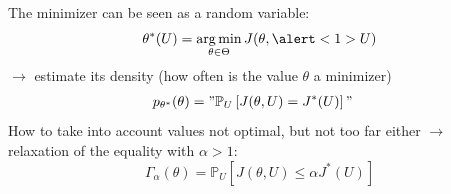 \documentclass[11pt]{beamer}
\newcommand{\Prob}{\mathbb{P}}
\DeclareMathOperator*{\argmin}{arg\,min}
\newcommand{\kk}{\theta}
\newcommand{\uu}{u}
\newcommand{\UU}{U}
\newcommand{\Kspace}{\Theta}
\begin{document}
{  
      The minimizer can be seen as a random variable:
      \begin{equation*}
        \kk^*(\UU) = \argmin_{\kk\in\Kspace} J(\kk,\alert<1>{\UU})
      \end{equation*}
      $\longrightarrow$ estimate its density (how often is the value $\kk$ a minimizer)
      \begin{align*}
        p_{\kk^*}(\kk)%
                                               &= "\Prob_{\UU}\left[J(\kk,\UU)= J^*(\UU) \right]"                                               %
      \end{align*}
      \pause
      How to take into account values not optimal, but not too far either
      $\longrightarrow$ relaxation of the equality with $\alpha> 1$:
      \begin{equation*}
        \Gamma_{\alpha}(\kk) = \Prob_{\UU}\left[J(\kk,\UU) \leq \alpha J^*(\UU) \right]
      \end{equation*}
}
\end{document}
